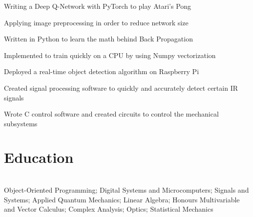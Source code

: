 \documentclass[]{deedy-resume-openfont}
\begin{document}
\begin{tightemize}
    \item Writing a Deep Q-Network with PyTorch to play Atari's Pong
    \item Applying image preprocessing in order to reduce network size
\end{tightemize}

\vspace{8pt}

\begin{tightemize}
    \item Written in Python to learn the math behind Back Propagation 
    \item Implemented to train quickly on a CPU by using Numpy vectorization
\end{tightemize}

\vspace{8pt}

\begin{tightemize}
    \item Deployed a real-time object detection algorithm on Raspberry Pi
    \item Created signal processing software to quickly and accurately detect certain IR signals
    \item Wrote C control software and created circuits to control the mechanical subsystems
\end{tightemize}

\vspace{12pt}

\section{Education}

\begin{adjustwidth}{0.55cm}{1.25cm}
     \\
     Object-Oriented Programming; Digital Systems and Microcomputers; Signals and Systems; Applied Quantum Mechanics; Linear Algebra; Honours Multivariable and Vector Calculus; Complex Analysis; Optics; Statistical Mechanics
\end{adjustwidth}
\vspace{8pt}
\end{document}
